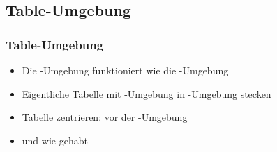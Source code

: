 \subsection{Table-Umgebung}
\begin{frame}[fragile]
\frametitle{Table-Umgebung}
\begin{itemize}
    \item Die -Umgebung funktioniert wie die -Umgebung\pause
    \item Eigentliche Tabelle mit -Umgebung in -Umgebung
        stecken\pause
    \item Tabelle zentrieren:  vor der -Umgebung\pause
    \item {} und  wie gehabt
\end{itemize}

\end{frame}
